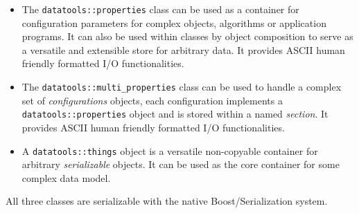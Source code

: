 \documentclass[a4paper,12pt]{article}
\begin{document}
\begin{itemize}

\item  The  \texttt{datatools::properties}  class  can be  used  as  a
  container   for  configuration   parameters  for   complex  objects,
  algorithms  or application  programs.  It can  also  be used  within
  classes by object composition to serve as a versatile and extensible
  store for arbitrary data. It provides ASCII human friendly formatted
  I/O functionalities.

\item The  \texttt{datatools::multi\_properties} class can  be used to
  handle  a   complex  set  of   \emph{configurations}  objects,  each
  configuration implements a \texttt{datatools::properties} object and
  is  stored within a  named \emph{section}.  It provides  ASCII human
  friendly formatted I/O functionalities.

\item A \texttt{datatools::things}  object is a versatile non-copyable
  container for arbitrary \emph{serializable}  objects. It can be used
  as the core container for some complex data model.

\end{itemize}

All three classes are serializable with the native Boost/Serialization
system.
\end{document}
